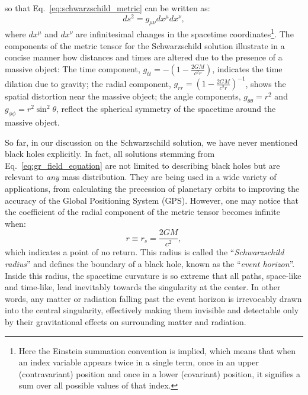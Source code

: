 \documentclass[main.tex]{subfiles}
\begin{document}
    so that Eq.~\eqref{eq:schwarzschild_metric} can be written as:
    \begin{equation}\label{eq:schwarzschild_metric2}
        ds^2 = g_{\mu \nu}dx^\mu dx^\nu,
    \end{equation}
    where $dx^\mu$ and $dx^\nu$ are infinitesimal changes in the spacetime coordinates\footnote{Here the Einstein summation convention is implied, which means that when an index variable appears twice in a single term, once in an upper (contravariant) position and once in a lower (covariant) position, it signifies a sum over all possible values of that index.}.
    The components of the metric tensor for the Schwarzschild solution illustrate in a concise manner how distances and times are altered due to the presence of a massive object: The time component, $g_{tt} = -\left(1 - \frac{2GM}{c^2r}\right)$, indicates the time dilation due to gravity; the radial component, $g_{rr} = \left(1 - \frac{2GM}{c^2r}\right)^{-1}$, shows the spatial distortion near the massive object; the angle components, $g_{\theta\theta} = r^2$ and $g_{\phi\phi} = r^2\sin^2\theta$, reflect the spherical symmetry of the spacetime around the massive object. 

    So far, in our discussion on the Schwarzschild solution, we have never mentioned black holes explicitly. In fact, all solutions stemming from Eq.~\eqref{eq:gr_field_equation} are not limited to describing black holes but are relevant to \textit{any} mass distribution. They are being used in a wide variety of applications, from calculating the precession of planetary orbits to improving the accuracy of the Global Positioning System (GPS). However, one may notice that the coefficient of the radial component of the metric tensor becomes infinite when:
    \begin{equation}\label{eq:schwarzschild_radius}
        r \equiv r_s = \frac{2GM}{c^2},
    \end{equation}
    which indicates a point of no return. This radius is called the ``\textit{Schwarzschild radius}'' and defines the boundary of a black hole, known as the ``\textit{event horizon}''. Inside this radius, the spacetime curvature is so extreme that all paths, space-like and time-like, lead inevitably towards the singularity at the center. In other words, any matter or radiation falling past the event horizon is irrevocably drawn into the central singularity, effectively making them invisible and detectable only by their gravitational effects on surrounding matter and radiation.
\end{document}
